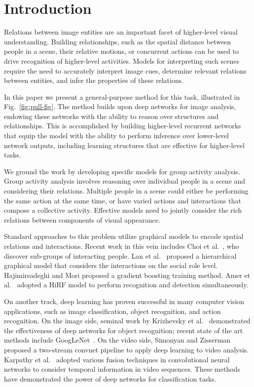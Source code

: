 \documentclass[10pt,twocolumn,letterpaper]{article}
\begin{document}
\section{Introduction}




Relations between image entities are an important facet of higher-level visual understanding.  Building relationships, such as the spatial distance between people in a scene, their relative motions, or concurrent actions can be used to drive recognition of higher-level activities.  Models for interpreting such scenes require the need to accurately interpret image cues, determine relevant relations between entities, and infer the properties of these relations.

In this paper we present a general-purpose method for this task, illustrated in Fig.~\ref{fig:pull-fig}.  The method builds upon deep networks for image analysis, endowing these networks with the ability to reason over structures and relationships.  This is accomplished by building higher-level recurrent networks that
equip the model with the ability to perform inference over lower-level network outputs, including learning structures that are effective for higher-level tasks.

We ground the work by developing specific models for group activity analysis.
Group activity analysis involves reasoning over individual people in a scene and considering their relations.  Multiple people in a scene could either be performing the same action at the same time, or have varied actions and interactions that compose a collective activity. Effective models need to jointly consider the rich relations between components of visual appearance. 

Standard approaches to this problem utilize graphical models to encode spatial relations and interactions. Recent work in this vein includes Choi et al.~\cite{ChoiCPS14}, who discover sub-groups of interacting people.  Lan et al.~\cite{LanSM12} proposed a hierarchical graphical model that considers the interactions on the social role level. Hajimirsadeghi and Mori \cite{HajimirsadeghiM15} proposed a gradient boosting training method. Amer et al.~\cite{AmerLT14} adopted a HiRF model to perform recognition and detection simultaneously. 




On another track, deep learning has proven successful in many computer vision applications, such as image classification, object recognition, and action recognition. On the image side, seminal work by Krizhevsky et al.~\cite{KrizhevskySH12} demonstrated the effectiveness of deep networks for object recognition; recent state of the art methods include GoogLeNet~\cite{Szegedy15}. On the video side, Simonyan and Zisserman~\cite{SimonyanZ14} proposed a two-stream convnet pipeline to apply deep learning to video analysis. Karpathy et al.~\cite{KarpathyTSLSF14} adopted various fusion techniques in convolutional neural networks to consider temporal information in video sequences. These methods have demonstrated the power of deep networks for classification tasks.
\end{document}
